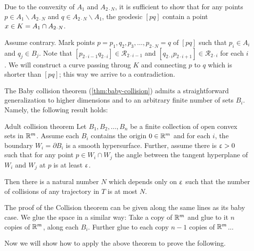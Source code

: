 Due to the convexity of $A_1$ and $A_{2\cdot N}$,
it is sufficient to show that for any points $p\in A_1\backslash A_{2\cdot N}$ and $q\in A_{2\cdot N}\backslash A_1$,
the geodesic $[pq]$ contain a point $x\in K\z=A_1\cap A_{2\cdot N}$.

Assume contrary.
Mark points $p=p_1,q_2,p_3,\dots,p_{2\cdot N}=q$ of $[pq]$ such that $p_i\in A_i$ and $q_j\in B_j$.
Note that $[p_{2\cdot i-1}q_{2\cdot i}]\in \mathcal{R}_{2\cdot i-1}$ 
and 
$[q_{2\cdot i}p_{2\cdot i+1}]\in \mathcal{R}_{2\cdot i}$ for each $i$.
We will construct a curve passing throug $K$ and connecting $p$ to $q$ which is shorter than $[pq]$;
this way we arrive to a contradiction. 







\qeds

The Baby collision theorem (\ref{thm:baby-collision}) admits a straightforward generalization to higher dimensions and to an arbitrary finite number of sets $B_i$.
Namely, the following result holds:

\begin{thm}{Adult collision theorem}\label{thm:adult-collision}
Let $B_1,B_2,\dots,B_n$ be a finite collection of open convex sets in $\mathbb{R}^m$.
Assume each $B_i$ contains the origin $0\in\RR^m$
and for each $i$, the boundary $W_i=\partial B_i$ is a smooth hypersurface.
Further, assume there is $\upvarepsilon>0$ such that for any point $p\in W_i\cap W_j$ the angle between the tangent 
hyperplane of $W_i$ and $W_j$ at $p$ is at least $\upvarepsilon$.

Then 
there is a natural number $N$ which depends only on $\upvarepsilon$
such that the number of collisions of any trajectory in $T$ is at most $N$.
\end{thm}

The proof of the Collision theorem can be given along the same lines as its baby case.
We glue the space in a similar way:
Take a copy of $\mathbb{R}^m$
and glue to it $n$ copies of $\mathbb{R}^m$, along each $B_i$.
Further glue to each copy $n-1$ copies of $\mathbb{R}^m$... 

Now we will show how to apply the above theorem to prove the following. 